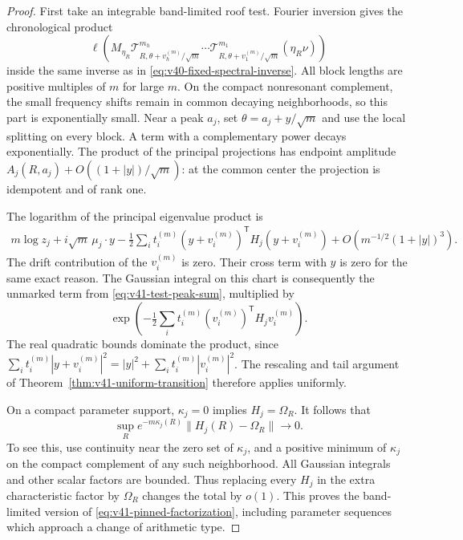 \begin{proof}
First take an integrable band-limited roof test. Fourier inversion gives
the chronological product
\begin{equation}\label{eq:v41-pinned-product}
 \ell\left(M_{\eta_R}
  \mathscr T_{R,\theta+v_h^{(m)}/\sqrt m}^{m_h}\cdots
  \mathscr T_{R,\theta+v_1^{(m)}/\sqrt m}^{m_1}(\eta_R\nu)\right)
\end{equation}
inside the same inverse as in \eqref{eq:v40-fixed-spectral-inverse}.
All block lengths are positive multiples of $m$ for large $m$.
On the compact nonresonant complement, the small frequency shifts
remain in common decaying neighborhoods, so this part is exponentially
small. Near a peak $a_j$, set $\theta=a_j+y/\sqrt m$ and use the local
splitting on every block. A term with a complementary power decays
exponentially. The product of the principal projections has endpoint
amplitude $A_j(R,a_j)+O((1+|y|)/\sqrt m)$: at the common center the
projection is idempotent and of rank one.

The logarithm of the principal eigenvalue product is
\begin{align*}
 m\log z_j+i\sqrt m\,\mu_j\cdot y
   -\frac12\sum_i t_i^{(m)}(y+v_i^{(m)})^{\mathsf T}
                       H_j(y+v_i^{(m)})
                 +O(m^{-1/2}(1+|y|)^3).
\end{align*}
The drift contribution of the $v_i^{(m)}$ is zero. Their cross term
with $y$ is zero for the same exact reason. The Gaussian integral on
this chart is consequently the unmarked term from
\eqref{eq:v41-test-peak-sum}, multiplied by
\[
 \exp\left(-\tfrac12\sum_i t_i^{(m)}
                      (v_i^{(m)})^{\mathsf T}H_jv_i^{(m)}\right).
\]
The real quadratic bounds dominate the product, since
$\sum_i t_i^{(m)}|y+v_i^{(m)}|^2
=|y|^2+\sum_i t_i^{(m)}|v_i^{(m)}|^2$.
The rescaling and tail argument of
Theorem~\ref{thm:v41-uniform-transition} therefore applies uniformly.

On a compact parameter support, $\kappa_j=0$ implies $H_j=\Omega_R$.
It follows that
\begin{equation}\label{eq:v41-damped-curvature-continuity}
 \sup_R e^{-m\kappa_j(R)}\|H_j(R)-\Omega_R\|\longrightarrow0.
\end{equation}
To see this, use continuity near the zero set of $\kappa_j$, and a
positive minimum of $\kappa_j$ on the compact complement of any such
neighborhood. All Gaussian integrals and other scalar factors are
bounded. Thus replacing every $H_j$ in the extra characteristic factor
by $\Omega_R$ changes the total by $o(1)$. This proves the band-limited
version of \eqref{eq:v41-pinned-factorization}, including parameter
sequences which approach a change of arithmetic type.


\end{proof}
